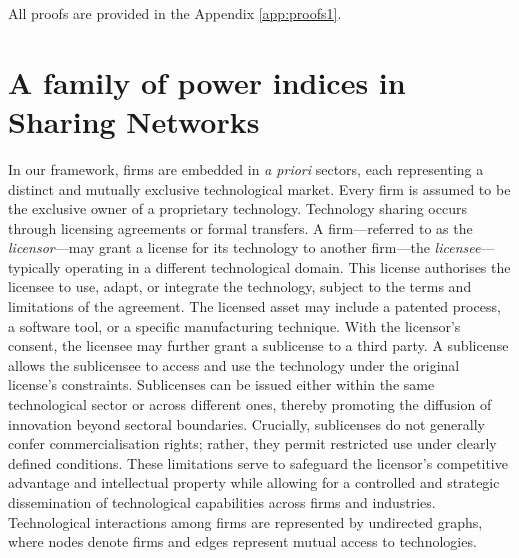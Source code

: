 \documentclass[preprint,11pt,authoryear]{elsarticle}
\theoremstyle{plain}
\begin{document}
All proofs are provided in the Appendix \ref{app:proofs1}.


\section{A family of power indices in Sharing Networks}\label{sect1}
In our framework, firms are embedded in \emph{a priori} sectors, each representing a distinct and mutually exclusive technological market. Every firm is assumed to be the exclusive owner of a proprietary technology.
Technology sharing occurs through licensing agreements or formal transfers. A firm—referred to as the \emph{licensor}—may grant a license for its technology to another firm—the \emph{licensee}—typically operating in a different technological domain. This license authorises the licensee to use, adapt, or integrate the technology, subject to the terms and limitations of the agreement. The licensed asset may include a patented process, a software tool, or a specific manufacturing technique.
With the licensor’s consent, the licensee may further grant a sublicense to a third party. A sublicense allows the sublicensee to access and use the technology under the original license’s constraints. Sublicenses can be issued either within the same technological sector or across different ones, thereby promoting the diffusion of innovation beyond sectoral boundaries.
Crucially, sublicenses do not generally confer commercialisation rights; rather, they permit restricted use under clearly defined conditions. These limitations serve to safeguard the licensor’s competitive advantage and intellectual property while allowing for a controlled and strategic dissemination of technological capabilities across firms and industries.
Technological interactions among firms are represented by undirected graphs, where nodes denote firms and edges represent mutual access to technologies. 
\end{document}
